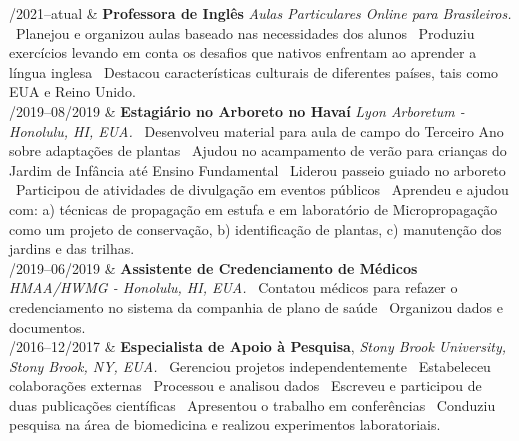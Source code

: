 \documentclass[11pt, a4paper]{article}
\newcommand{\Duration}[2]{\fontsize{10pt}{0}\selectfont #1--#2}
\begin{document}
\begin{EntriesTable}

	\Duration{02/2021}{atual}  &
	\textbf{Professora de Inglês}
	\newline
	\textit{Aulas Particulares Online para Brasileiros.}
	\newline
	\textbullet \ Planejou e organizou aulas baseado nas necessidades dos alunos 
	\textbullet \ Produziu exercícios levando em conta os desafios
	que nativos enfrentam ao aprender a língua inglesa
	\textbullet \ Destacou características culturais de diferentes países, 
	tais como EUA e Reino Unido.
	\\

	\Duration{06/2019}{08/2019}  &
	\textbf{Estagiário no Arboreto no Havaí}
	\newline
	\textit{Lyon Arboretum - Honolulu, HI, EUA.}
	\newline
	\textbullet \ Desenvolveu material para aula de campo do Terceiro 
	Ano sobre adaptações de plantas 
	\textbullet \ Ajudou no acampamento de verão para 
	crianças do Jardim de Infância até Ensino Fundamental 
	\textbullet \ Liderou passeio guiado no arboreto 
	\textbullet \ Participou de atividades de divulgação em 
	eventos públicos 
	\textbullet \ Aprendeu e ajudou com: a) técnicas de propagação em estufa
	e em laboratório de Micropropagação como um projeto de conservação, b)
	identificação de plantas, c) manutenção dos jardins e das trilhas.
	\\

	\Duration{03/2019}{06/2019}  &
	\textbf{Assistente de Credenciamento de Médicos}
	\newline
	\textit{HMAA/HWMG - Honolulu, HI, EUA.}
	\newline
	\textbullet \ Contatou médicos para refazer o credenciamento no sistema 
	da companhia de plano de saúde 
	\textbullet \ Organizou dados e documentos.
	\\

	\Duration{08/2016}{12/2017}  &
	\textbf{Especialista de Apoio à Pesquisa},
	\newline
	\textit{Stony Brook University, Stony Brook, NY, EUA.}
	\newline
	\textbullet \ Gerenciou projetos independentemente 
	\textbullet \ Estabeleceu colaborações externas 
	\textbullet \ Processou e analisou dados 
	\textbullet \ Escreveu e participou de duas publicações científicas 
	\textbullet \ Apresentou o trabalho em conferências 
	\textbullet\ Conduziu pesquisa na área de biomedicina e realizou 
	experimentos laboratoriais.
	\\

\end{EntriesTable}
\end{document}

